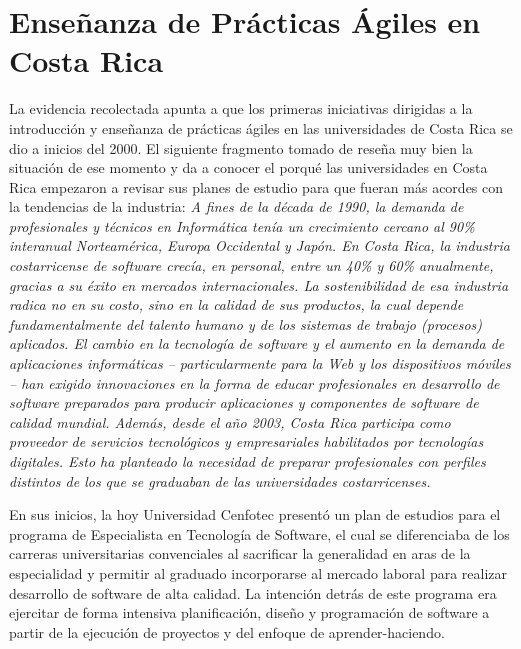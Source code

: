 \documentclass[journal]{IEEEtran}
\begin{document}
\section{Enseñanza de Prácticas Ágiles en Costa Rica}
La evidencia recolectada apunta a que los primeras iniciativas dirigidas a la introducción y enseñanza de prácticas ágiles en las universidades de Costa Rica se dio a inicios del 2000. El siguiente fragmento tomado de \cite{cenfotec-2} reseña muy bien la situación de ese momento y da a conocer el porqué las universidades en Costa Rica empezaron a revisar sus planes de estudio para que fueran más acordes con la tendencias de la industria: \emph{A fines de la década de 1990, la demanda de profesionales y técnicos en Informática tenía un crecimiento cercano al 90\% interanual Norteamérica, Europa Occidental y Japón. En Costa Rica, la industria costarricense de software crecía, en personal, entre un 40\% y 60\% anualmente, gracias a su éxito en mercados internacionales. La sostenibilidad de esa industria radica no en su costo, sino en la calidad de sus productos, la cual depende fundamentalmente del talento humano y de los sistemas de trabajo (procesos) aplicados. El cambio en la tecnología de software y el aumento en la demanda de aplicaciones informáticas – particularmente para la Web y los dispositivos móviles – han exigido innovaciones en la forma de educar profesionales en desarrollo de software preparados para producir aplicaciones y componentes de software de calidad mundial. Además, desde el año 2003, Costa Rica participa como proveedor de servicios tecnológicos y empresariales habilitados por tecnologías digitales. Esto ha planteado la necesidad de preparar profesionales con perfiles distintos de los que se graduaban de las universidades costarricenses.}

En sus inicios, la hoy Universidad Cenfotec \cite{cenfotec-1} presentó un plan de estudios para el programa de Especialista en Tecnología de Software, el cual se diferenciaba de los carreras universitarias convenciales al sacrificar la generalidad en aras de la especialidad y permitir al graduado incorporarse al mercado laboral para realizar desarrollo de software de alta calidad. La intención detrás de este programa era ejercitar de forma intensiva planificación, diseño y programación de software a partir de la ejecución de proyectos y del enfoque de aprender-haciendo.
\end{document}
